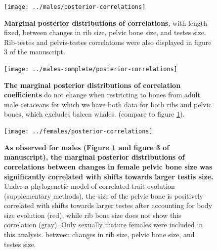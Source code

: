 \documentclass[12pt]{article}
\begin{document}
\begin{figure}[ht]
  \begin{center}
    \texttt{[image: ../males/posterior-correlations]}
  \end{center}
  \caption{\textbf{Marginal posterior distributions of correlations}, 
  with length fixed, between changes in rib size, pelvic bone size, and testes size.
  Rib-testes and pelvis-testes correlations were also displayed in figure 3 of the manuscript.
  \label{fig:males_posterior_cors}
  }
\end{figure}

\begin{figure}[ht]
  \begin{center}
    \texttt{[image: ../males-complete/posterior-correlations]}
  \end{center}
  \caption{
  \textbf{The marginal posterior distributions of correlation coefficients} 
  do not change when restricting to bones from adult male cetaceans for which we have both data for both ribs and pelvic bones,
  which excludes baleen whales.  (compare to figure \ref{fig:males_posterior_cors}).
  \label{fig:males_complete_posterior_cors}
  }
\end{figure}

\begin{figure}[ht]
  \begin{center}
    \texttt{[image: ../females/posterior-correlations]}
  \end{center}
  \caption{
  \textbf{As observed for males (Figure \ref{fig:males_posterior_cors} and figure 3 of manuscript), the marginal posterior
distributions of correlations between changes in female pelvic bone size was significantly
correlated with shifts towards larger testis size.} Under a phylogenetic model of correlated trait
evolution (supplementary methods), the size of the pelvic bone is positively correlated with shifts
towards larger testes after accounting for body size evolution (red), while rib bone size does not show
this correlation (gray). Only sexually mature females were included in this analysis.
  between changes in rib size, pelvic bone size, and testes size.
  \label{fig:female_posterior_cors}
  }
\end{figure}



\processdelayedfloats


\end{document}
